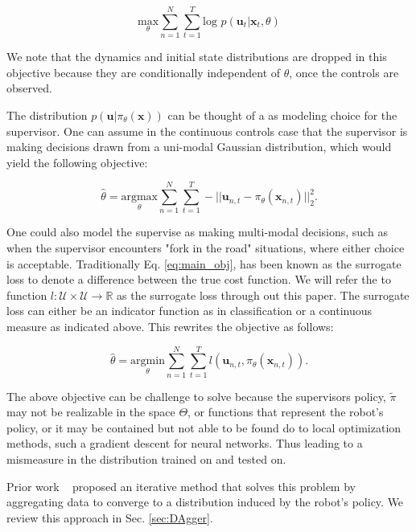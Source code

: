 \documentclass[10pt, conference]{ieeeconf}      %
\newcommand{\bu}{\mathbf{u}}
\newcommand{\bx}{\mathbf{x}}
\begin{document}
$$\underset{\theta}{\mbox{max}} \sum^N_{n=1}\sum^T_{t=1}\mbox{log }p(\bu_t|\bx_t,\theta)$$

We note that the dynamics and initial state distributions are dropped in this objective because they are conditionally independent of $\theta$, once the controls are observed. 

The distribution $p(\bu|\pi_\theta(\bx))$ can be thought of a as modeling choice for the supervisor. One can assume in the continuous controls case that the supervisor is making decisions drawn from a uni-modal Gaussian distribution, which would yield the following objective:

\begin{equation}\label{eq:main_obj}
\hat{\theta} = \underset{\theta}{\mbox{argmax}} \sum^N_{n=1}\sum^T_{t=1}-|| \bu_{n,t} - \pi_{\theta} (\bx_{n,t})||^2_2.
\end{equation}

One could also model the supervise as making multi-modal decisions, such as when the supervisor encounters "fork in the road" situations, where either choice is acceptable. Traditionally  Eq. \ref{eq:main_obj}, has been known as the surrogate loss to denote a difference between the true cost function. We will refer the to function $l : \mathcal{U} \times \mathcal{U} \rightarrow \mathbb{R}$ as the surrogate loss through out this paper. The surrogate loss can either be an indicator function as in classification or a continuous measure as indicated above.  This rewrites the objective as follows: 

\begin{equation}\label{eq:main_obj}
\hat{\theta} = \underset{\theta}{\mbox{argmin}} \sum^N_{n=1}\sum^T_{t=1} l(\bu_{n,t}, \pi_{\theta} (\bx_{n,t})).
\end{equation}


 The above objective can be challenge to solve because the supervisors policy, $\tilde{\pi}$ may not be realizable in the space $\Theta$, or functions that represent the robot's policy, or it may be contained but not able to be found do to local optimization methods, such a gradient descent for neural networks.  Thus leading to a mismeasure in the distribution trained on and tested on. 
 
 Prior work ~\cite{ross2010reduction}  proposed an iterative method that solves this problem by aggregating data to converge to a distribution induced by the robot's policy. We review this approach in Sec. \ref{sec:DAgger}.
 
\end{document}
